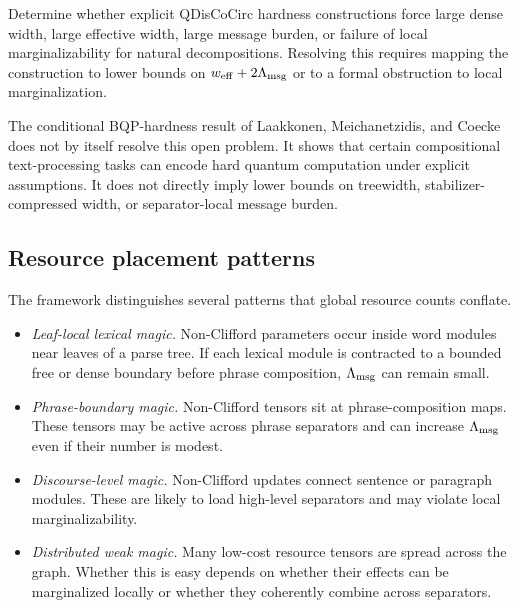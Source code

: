 \begin{openproblem}
\label{conj:qdiscocirc-nonvacuity}
Determine whether explicit QDisCoCirc hardness constructions force large dense width, large effective width, large message burden, or failure of local marginalizability for natural decompositions. Resolving this requires mapping the construction to lower bounds on \(w_{\mathrm{eff}}+2\Lambda_{\mathrm{msg}}\) or to a formal obstruction to local marginalization.
\end{openproblem}

The conditional BQP-hardness result of Laakkonen, Meichanetzidis, and Coecke~\citep{LaakkonenMeichanetzidisCoecke2024} does not by itself resolve this open problem. It shows that certain compositional text-processing tasks can encode hard quantum computation under explicit assumptions. It does not directly imply lower bounds on treewidth, stabilizer-compressed width, or separator-local message burden.

\subsection{Resource placement patterns}

The framework distinguishes several patterns that global resource counts conflate.

\begin{itemize}[leftmargin=1.2cm]
\item \emph{Leaf-local lexical magic.} Non-Clifford parameters occur inside word modules near leaves of a parse tree. If each lexical module is contracted to a bounded free or dense boundary before phrase composition, \(\Lambda_{\mathrm{msg}}\) can remain small.

\item \emph{Phrase-boundary magic.} Non-Clifford tensors sit at phrase-composition maps. These tensors may be active across phrase separators and can increase \(\Lambda_{\mathrm{msg}}\) even if their number is modest.

\item \emph{Discourse-level magic.} Non-Clifford updates connect sentence or paragraph modules. These are likely to load high-level separators and may violate local marginalizability.

\item \emph{Distributed weak magic.} Many low-cost resource tensors are spread across the graph. Whether this is easy depends on whether their effects can be marginalized locally or whether they coherently combine across separators.
\end{itemize}


